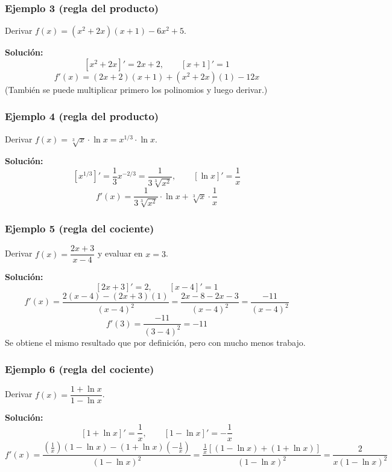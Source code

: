 \documentclass[12pt]{article}
\begin{document}
\subsubsection{Ejemplo 3 (regla del producto)}


Derivar $f(x) = (x^2 + 2x)(x + 1) - 6x^2 + 5$.

\textbf{Solución:}
\[
[x^2 + 2x]' = 2x + 2, \qquad [x + 1]' = 1
\]
\[
f'(x) = (2x + 2)(x + 1) + (x^2 + 2x)(1) - 12x
\]
(También se puede multiplicar primero los polinomios y luego derivar.)



\subsubsection{Ejemplo 4 (regla del producto)}


Derivar $f(x) = \sqrt[3]{x} \cdot \ln x = x^{1/3} \cdot \ln x$.

\textbf{Solución:}
\[
\left[x^{1/3}\right]' = \frac{1}{3}x^{-2/3} = \frac{1}{3\sqrt[3]{x^2}}, \qquad [\ln x]' = \frac{1}{x}
\]
\[
f'(x) = \frac{1}{3\sqrt[3]{x^2}} \cdot \ln x + \sqrt[3]{x} \cdot \frac{1}{x}
\]



\subsubsection{Ejemplo 5 (regla del cociente)}


Derivar $f(x) = \dfrac{2x + 3}{x - 4}$ y evaluar en $x = 3$.

\textbf{Solución:}
\[
[2x + 3]' = 2, \qquad [x - 4]' = 1
\]
\[
f'(x) = \frac{2(x - 4) - (2x + 3)(1)}{(x - 4)^2} = \frac{2x - 8 - 2x - 3}{(x - 4)^2} = \frac{-11}{(x - 4)^2}
\]
\[
f'(3) = \frac{-11}{(3 - 4)^2} = -11
\]
Se obtiene el mismo resultado que por definición, pero con mucho menos trabajo.



\subsubsection{Ejemplo 6 (regla del cociente)}


Derivar $f(x) = \dfrac{1 + \ln x}{1 - \ln x}$.

\textbf{Solución:}
\[
[1 + \ln x]' = \frac{1}{x}, \qquad [1 - \ln x]' = -\frac{1}{x}
\]
\[
f'(x) = \frac{\left(\frac{1}{x}\right)(1 - \ln x) - (1 + \ln x)\left(-\frac{1}{x}\right)}{(1 - \ln x)^2}
= \frac{\frac{1}{x}\left[(1 - \ln x) + (1 + \ln x)\right]}{(1 - \ln x)^2}
= \frac{2}{x(1 - \ln x)^2}
\]
\end{document}
